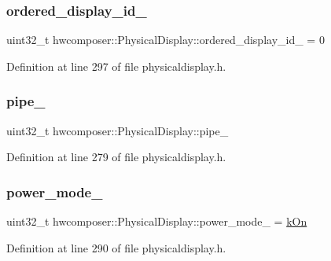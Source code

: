 \subsubsection{\texorpdfstring{ordered\+\_\+display\+\_\+id\+\_\+}{ordered\_display\_id\_}}
{\footnotesize\ttfamily uint32\+\_\+t hwcomposer\+::\+Physical\+Display\+::ordered\+\_\+display\+\_\+id\+\_\+ = 0\hspace{0.3cm}{\ttfamily [protected]}}



Definition at line 297 of file physicaldisplay.\+h.

\mbox{\label{classhwcomposer_1_1PhysicalDisplay_a6e44cfaecf46642d3c0f0347e26d2d6a}} 
\subsubsection{\texorpdfstring{pipe\+\_\+}{pipe\_}}
{\footnotesize\ttfamily uint32\+\_\+t hwcomposer\+::\+Physical\+Display\+::pipe\+\_\+\hspace{0.3cm}{\ttfamily [protected]}}



Definition at line 279 of file physicaldisplay.\+h.

\mbox{\label{classhwcomposer_1_1PhysicalDisplay_ac2f383cc7b186eab567292239c700c50}} 
\subsubsection{\texorpdfstring{power\+\_\+mode\+\_\+}{power\_mode\_}}
{\footnotesize\ttfamily uint32\+\_\+t hwcomposer\+::\+Physical\+Display\+::power\+\_\+mode\+\_\+ = \mbox{\hyperlink{hwcdefs_8h_afeed7d73a1340d1260c45cbe952c97bea67b46c19ded71fc8128a6c1f5aa361df}{k\+On}}\hspace{0.3cm}{\ttfamily [protected]}}



Definition at line 290 of file physicaldisplay.\+h.

